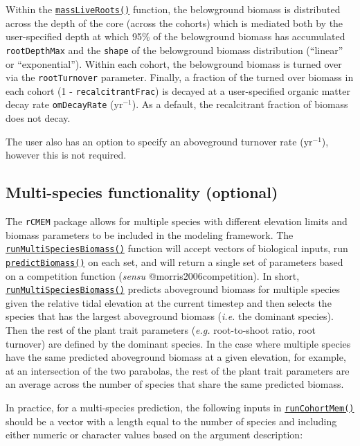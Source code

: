 Within the \protect\hyperlink{massliveroots}{\texttt{massLiveRoots()}}
function, the belowground biomass is distributed across the depth of the
core (across the cohorts) which is mediated both by the user-specified
depth at which 95\% of the belowground biomass has accumulated
\texttt{rootDepthMax} and the \texttt{shape} of the belowground biomass
distribution (``linear'' or ``exponential''). Within each cohort, the
belowground biomass is turned over via the \texttt{rootTurnover}
parameter. Finally, a fraction of the turned over biomass in each cohort
(1 - \texttt{recalcitrantFrac}) is decayed at a user-specified organic
matter decay rate \texttt{omDecayRate} (\(\text{yr}^{-1}\)). As a
default, the recalcitrant fraction of biomass does not decay.

The user also has an option to specify an aboveground turnover rate
(\(\text{yr}^{-1}\)), however this is not required.

\hypertarget{multi-species-functionality-optional}{%
\subsection{Multi-species functionality
(optional)}\label{multi-species-functionality-optional}}

The \texttt{rCMEM} package allows for multiple species with different
elevation limits and biomass parameters to be included in the modeling
framework. The
\protect\hyperlink{runmultispeciesbiomass}{\texttt{runMultiSpeciesBiomass()}}
function will accept vectors of biological inputs, run
\protect\hyperlink{predictbiomass}{\texttt{predictBiomass()}} on each
set, and will return a single set of parameters based on a competition
function (\emph{sensu} @morris2006competition). In short,
\protect\hyperlink{runmultispeciesbiomass}{\texttt{runMultiSpeciesBiomass()}}
predicts aboveground biomass for multiple species given the relative
tidal elevation at the current timestep and then selects the species
that has the largest aboveground biomass (\emph{i.e.} the dominant
species). Then the rest of the plant trait parameters (\emph{e.g.}
root-to-shoot ratio, root turnover) are defined by the dominant species.
In the case where multiple species have the same predicted aboveground
biomass at a given elevation, for example, at an intersection of the two
parabolas, the rest of the plant trait parameters are an average across
the number of species that share the same predicted biomass.

In practice, for a multi-species prediction, the following inputs in
\protect\hyperlink{runcohortmem}{\texttt{runCohortMem()}} should be a
vector with a length equal to the number of species and including either
numeric or character values based on the argument description:

